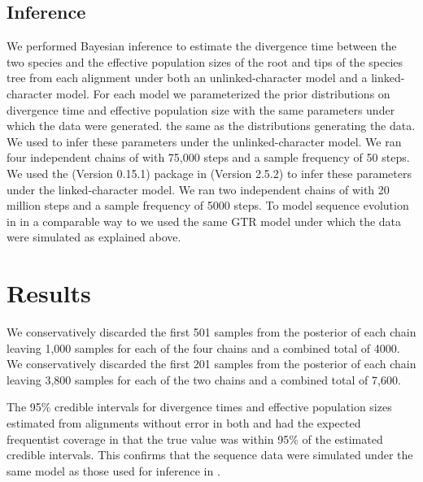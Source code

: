 \subsection{Inference}
We performed Bayesian inference to estimate the divergence time between the two species and the effective 
population sizes of the root and tips of the species tree from each alignment 
under both an unlinked-character model and a linked-character model. For each 
model we parameterized the prior distributions on divergence time and effective
population size with the same parameters under which the data were generated. 
the same as the distributions generating the data.
We used \ecoevolity
\citep[Version 0.3.2; dev branch commit a7e9bf2;][]{Oaks2018ecoevolity}
to infer these parameters under the 
unlinked-character model.
We ran four independent chains of \ecoevolity with 75,000 steps and a sample 
frequency of 50 steps.
We used the \beast (Version 0.15.1) \citep{@ogilvieStarBEAST2BringsFaster2017} 
package in \beastcore (Version 2.5.2) \citep{@bouckaertBEASTSoftwarePlatform2014}
to infer these parameters under the linked-character model. 
We ran two independent chains of \beast with 20 million steps and a 
sample frequency of 5000 steps. 
To model sequence evolution in \beast in a comparable way to \ecoevolity we used 
the same GTR model under which the data were simulated as explained above.


\section{Results}



We conservatively discarded the first 501 samples from the posterior of each 
\ecoevolity chain leaving 1,000 samples for each of the four chains and a combined
total of 4000.
We conservatively discarded the first 201 samples from the posterior of each 
\beast chain leaving 3,800 samples for each of the two chains and a combined
total of 7,600.


The 95\% credible intervals for divergence times and effective population 
sizes estimated from alignments without error in both \beast and \ecoevolity had 
the expected frequentist coverage in that the true value was within 95\% of the 
estimated credible intervals. This confirms that the sequence data were simulated
under the same model as those used for inference in \beast.


